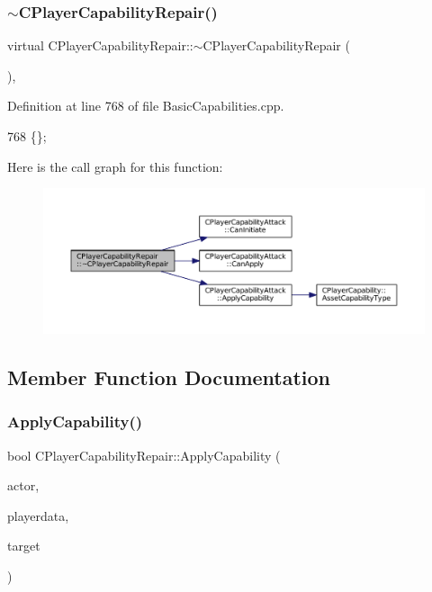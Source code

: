 \subsubsection{\texorpdfstring{$\sim$\+C\+Player\+Capability\+Repair()}{~CPlayerCapabilityRepair()}}
{\footnotesize\ttfamily virtual C\+Player\+Capability\+Repair\+::$\sim$\+C\+Player\+Capability\+Repair (\begin{DoxyParamCaption}{ }\end{DoxyParamCaption})\hspace{0.3cm}{\ttfamily [inline]}, {\ttfamily [virtual]}}



Definition at line 768 of file Basic\+Capabilities.\+cpp.


\begin{DoxyCode}
768 \{\};
\end{DoxyCode}
Here is the call graph for this function\+:\nopagebreak
\begin{figure}[H]
\begin{center}
\leavevmode
\includegraphics[width=350pt]{classCPlayerCapabilityRepair_ad8ed0fc101b58a3b4eeb42fa3cab0511_cgraph}
\end{center}
\end{figure}


\subsection{Member Function Documentation}
\hypertarget{classCPlayerCapabilityRepair_ab4e8da6f225b4bfb7023d75749454ff1}{}\label{classCPlayerCapabilityRepair_ab4e8da6f225b4bfb7023d75749454ff1} 
\subsubsection{\texorpdfstring{Apply\+Capability()}{ApplyCapability()}}
{\footnotesize\ttfamily bool C\+Player\+Capability\+Repair\+::\+Apply\+Capability (\begin{DoxyParamCaption}\item[{std\+::shared\+\_\+ptr$<$ \hyperlink{classCPlayerAsset}{C\+Player\+Asset} $>$}]{actor,  }\item[{std\+::shared\+\_\+ptr$<$ \hyperlink{classCPlayerData}{C\+Player\+Data} $>$}]{playerdata,  }\item[{std\+::shared\+\_\+ptr$<$ \hyperlink{classCPlayerAsset}{C\+Player\+Asset} $>$}]{target }\end{DoxyParamCaption})\hspace{0.3cm}{\ttfamily [virtual]}}



